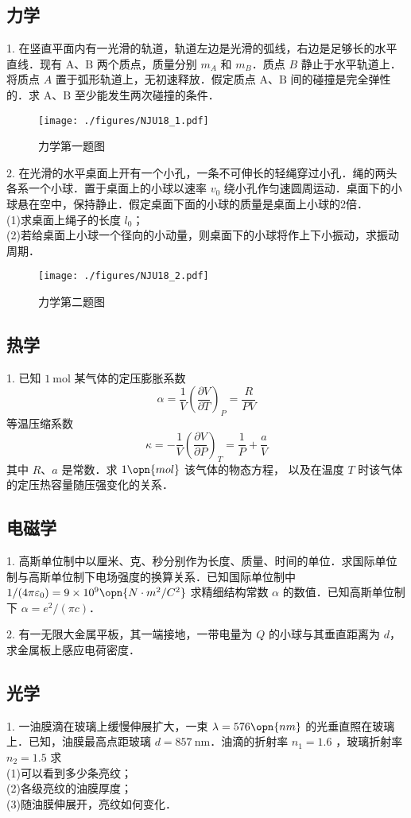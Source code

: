 \subsection{力学}
1. 在竖直平面内有一光滑的轨道，轨道左边是光滑的弧线，右边是足够长的水平直线．现有 $\mathrm{A}$、$\mathrm{B}$ 两个质点，质量分别 $m_{A}$ 和 $m_B$．质点 $B$ 静止于水平轨道上．将质点 $A$ 置于弧形轨道上，无初速释放．假定质点 $\mathrm{A}$、$\mathrm{B}$ 间的碰撞是完全弹性的．求 $\mathrm{A}$、$\mathrm{B}$ 至少能发生两次碰撞的条件．
\begin{figure}[ht]
\centering
\texttt{[image: ./figures/NJU18\_1.pdf]}
\caption{力学第一题图} \label{NJU18_fig1}
\end{figure}
2. 在光滑的水平桌面上开有一个小孔，一条不可伸长的轻绳穿过小孔．绳的两头各系一个小球．置于桌面上的小球以速率 $v_{0}$ 绕小孔作匀速圆周运动．桌面下的小球悬在空中，保持静止．假定桌面下面的小球的质量是桌面上小球的2倍．\\
(1)求桌面上绳子的长度 $l_{0}$；\\
(2)若给桌面上小球一个径向的小动量，则桌面下的小球将作上下小振动，求振动周期．
\begin{figure}[ht]
\centering
\texttt{[image: ./figures/NJU18\_2.pdf]}
\caption{力学第二题图} \label{NJU18_fig2}
\end{figure}
\subsection{热学}
1. 已知 $1 \mathrm{~mol}$ 某气体的定压膨胀系数
\begin{equation}
\alpha=\frac{1}{V}\left(\frac{\partial V}{\partial T}\right)_{P}=\frac{R}{P V}
\end{equation}
等温压缩系数 
\begin{equation}
\kappa=-\frac{1}{V}\left(\frac{\partial V}{\partial P}\right)_{T}=\frac{1}{P}+\frac{a}{V}
\end{equation}
其中 $R$、$a$ 是常数．求 $1\opn{mol}$ 该气体的物态方程， 以及在温度 $T$ 时该气体的定压热容量随压强变化的关系．
\subsection{电磁学}
1. 高斯单位制中以厘米、克、秒分别作为长度、质量、时间的单位．求国际单位制与高斯单位制下电场强度的换算关系．已知国际单位制中 $1/(4 \pi \varepsilon_{0})=9 \times 10^{9} \opn{N \cdot m^{2}/C^{2}}$ 求精细结构常数 $\alpha$ 的数值．已知高斯单位制下 $\alpha=e^{2}/(\pi c)$．

2. 有一无限大金属平板，其一端接地，一带电量为 $Q$ 的小球与其垂直距离为 $d$，求金属板上感应电荷密度．
\subsection{光学}
1. 一油膜滴在玻璃上缓慢伸展扩大，一束 $\lambda=576 \opn{nm}$ 的光垂直照在玻璃上．已知，油膜最高点距玻璃 $d=857 \mathrm{~nm}$．油滴的折射率 $n_{1}=1.6$ ，玻璃折射率 $n_{2}=1.5$ 求\\
(1)可以看到多少条亮纹；\\
(2)各级亮纹的油膜厚度；\\
(3)随油膜伸展开，亮纹如何变化．
